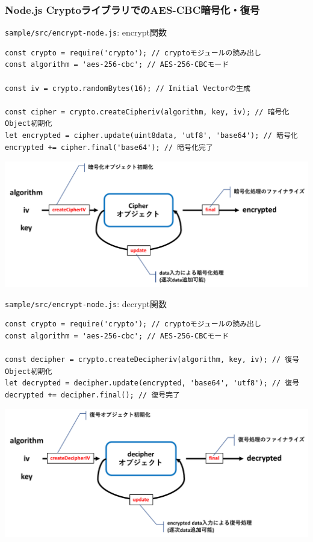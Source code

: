 \documentclass[12pt,dvipdfmx]{beamer}
\begin{document}
\begin{frame}[fragile]
\frametitle{Node.js CryptoライブラリでのAES-CBC暗号化・復号}
\begin{block}{\small \texttt{sample/src/encrypt-node.js}: encrypt関数}
\scriptsize
\begin{verbatim}
const crypto = require('crypto'); // cryptoモジュールの読み出し
const algorithm = 'aes-256-cbc'; // AES-256-CBCモード

const iv = crypto.randomBytes(16); // Initial Vectorの生成

const cipher = crypto.createCipheriv(algorithm, key, iv); // 暗号化Object初期化
let encrypted = cipher.update(uint8data, 'utf8', 'base64'); // 暗号化
encrypted += cipher.final('base64'); // 暗号化完了
\end{verbatim}
\end{block}

\begin{center}
\includegraphics[width=0.8\linewidth]{FigsSample01/node_aes_e.pdf}
\end{center}
\end{frame}

\begin{frame}[fragile]
\scriptsize
\begin{block}{\small \texttt{sample/src/encrypt-node.js}: decrypt関数}
\begin{verbatim}
const crypto = require('crypto'); // cryptoモジュールの読み出し
const algorithm = 'aes-256-cbc'; // AES-256-CBCモード

const decipher = crypto.createDecipheriv(algorithm, key, iv); // 復号Object初期化
let decrypted = decipher.update(encrypted, 'base64', 'utf8'); // 復号
decrypted += decipher.final(); // 復号完了
\end{verbatim}
\end{block}
\begin{center}
\includegraphics[width=0.8\linewidth]{FigsSample01/node_aes_d.pdf}
\end{center}
\end{frame}
\end{document}
